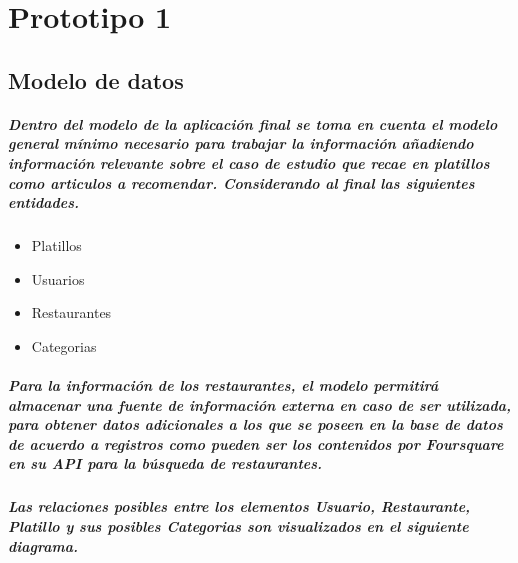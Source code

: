 \chapter{Prototipo 1}
\section{Modelo de datos}
\paragraph{Dentro del modelo de la aplicación final se toma en cuenta el modelo general mínimo necesario para trabajar la información añadiendo información relevante sobre el caso de estudio que recae en platillos como articulos a recomendar. Considerando al final las siguientes entidades.}

\begin{itemize}
  \item Platillos
  \item Usuarios
  \item Restaurantes
  \item Categorias
\end{itemize}

\paragraph{Para la información de los restaurantes, el modelo  permitirá almacenar una fuente de información externa en caso de ser utilizada, para obtener datos adicionales a los que se poseen en la base de datos de acuerdo a registros como pueden ser los contenidos por Foursquare en su API para la búsqueda de restaurantes.}

\paragraph{Las relaciones posibles entre los elementos Usuario, Restaurante, Platillo y sus posibles Categorias son visualizados en el siguiente diagrama.}

